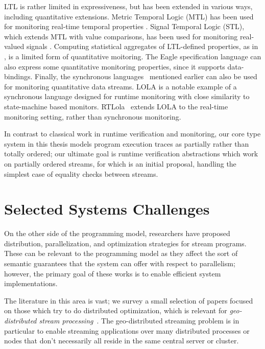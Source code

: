 LTL is rather limited in expressiveness, but has been extended in various ways,
including quantitative extensions.
Metric Temporal Logic (MTL) has been used for monitoring real-time temporal properties \cite{TR2005MTL}. Signal Temporal Logic (STL), which extends MTL with value comparisons, has been used for monitoring real-valued signals \cite{DDGJJS2017}.
Computing statistical aggregates of LTL-defined properties, as in \cite{finkbeiner2002collecting}, is a limited form of quantitative moitoring.
The Eagle specification language \cite{barringer2004rule} can also express some quantitative monitoring properties, since it supports data-bindings.
Finally, the synchronous languages~\cite{BCEHlGdS2003SL} mentioned earlier can also be used for monitoring quantitative data streams.
LOLA \cite{d2005lola,bozzelli2016foundations} is a notable example of a synchronous language designed for runtime monitoring
with close similarity to state-machine based monitors.
RTLola~\cite{faymonville2017real} extends LOLA to the real-time monitoring setting, rather than synchronous monitoring.

In contrast to classical work in runtime verification and monitoring, our core type system in this thesis models program execution traces as partially rather than totally ordered; our ultimate goal is runtime verification abstractions which work on partially ordered streams, for which  is an initial proposal, handling the simplest case of equality checks between streams.

\section{Selected Systems Challenges}

On the other side of the programming model,
researchers have proposed distribution, parallelization, and optimization strategies for stream programs.
These can be relevant to the programming model as they affect the sort of semantic guarantees that the system can offer with respect to parallelism;
however, the primary goal of these works is to enable efficient system implementations.

The literature in this area is vast; we survey a small selection of papers focused on those which try to do distributed optimization, which is relevant for \emph{geo-distributed stream processing}~. The geo-distributed streaming problem is in particular to enable streaming applications over many distributed processes or nodes that don't necessarily all reside in the same central server or cluster.

